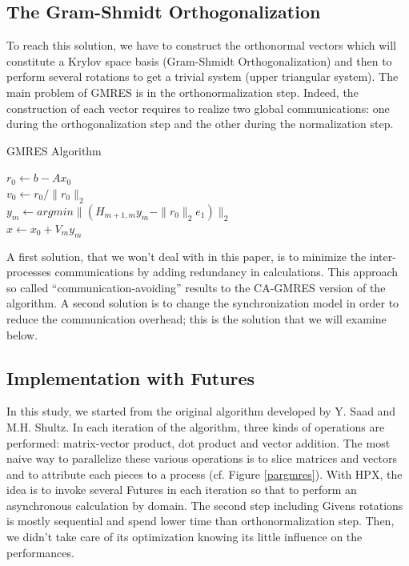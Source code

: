 \documentclass{llncs}
\begin{document}
\subsection{The Gram-Shmidt Orthogonalization}
To reach this solution, we have to construct the orthonormal vectors which will
constitute a Krylov space basis (Gram-Shmidt Orthogonalization) and then to
perform several rotations to get a trivial system (upper triangular system).
The main problem of GMRES is in the orthonormalization step. Indeed, the
construction of each vector requires to realize two global communications: one
during the orthogonalization step and the other during the normalization step.

\begin{algorithm}
\caption{GMRES Algorithm}
$r_0 \gets b-Ax_0$\\  
$v_0 \gets r_0/\|r_0\|_2$\\ 
  $y_m \gets argmin\|(H_{m+1,m}y_m - \|r_0\|_2e_1)\|_2$\\
  $x \gets x_0 + V_my_m$
\end{algorithm}

A first solution, that we won't deal with in this paper, is to minimize the
inter-processes communications by adding redundancy in calculations. This
approach so called \enquote{communication-avoiding} \cite{CAGMRES} results to
the CA-GMRES version of the algorithm. A second solution is to change the
synchronization model in order to reduce the communication overhead; this is
the solution that we will examine below.

\subsection{Implementation with Futures}
In this study, we started from the original algorithm \cite{GMRES} developed by
Y. Saad and M.H. Shultz. In each iteration of the algorithm, three kinds of
operations are performed: matrix-vector product, dot product and vector
addition. The most naive way to parallelize these various operations is to
slice matrices and vectors and to attribute each pieces to a process (cf.
Figure \ref{pargmres}). With HPX, the idea is to invoke several Futures in each
iteration so that to perform an asynchronous calculation by domain. The second
step including Givens rotations is mostly sequential and spend lower time than
orthonormalization step. Then, we didn't take care of its optimization knowing
its little influence on the performances.
\end{document}
